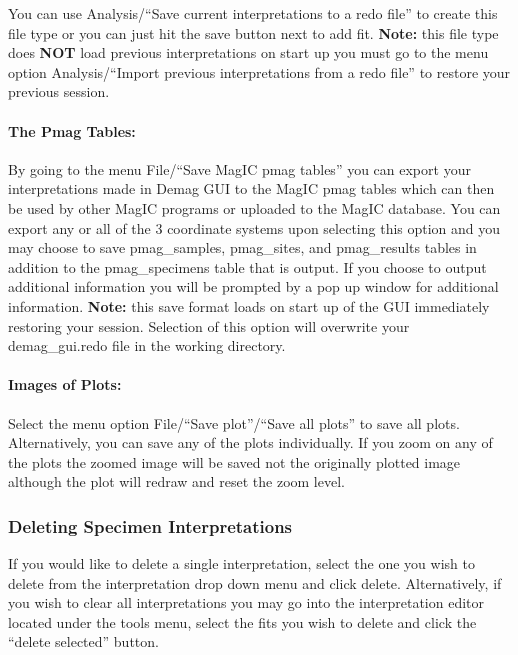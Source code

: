 You can use Analysis/``Save current interpretations to a redo file'' to
create this file type or you can just hit the save button next to add
fit. \textbf{Note:} this file type does \textbf{NOT} load previous
interpretations on start up you must go to the menu option
Analysis/``Import previous interpretations from a redo file'' to restore
your previous session.

\paragraph{The Pmag Tables:}\label{the-pmag-tables}

By going to the menu File/``Save MagIC pmag tables'' you can export your
interpretations made in Demag GUI to the MagIC pmag tables which can
then be used by other MagIC programs or uploaded to the MagIC database.
You can export any or all of the 3 coordinate systems upon selecting
this option and you may choose to save pmag\_samples, pmag\_sites, and
pmag\_results tables in addition to the pmag\_specimens table that is
output. If you choose to output additional information you will be
prompted by a pop up window for additional information. \textbf{Note:}
this save format loads on start up of the GUI immediately restoring your
session. Selection of this option will overwrite your demag\_gui.redo
file in the working directory.

\paragraph{Images of Plots:}\label{images-of-plots}

Select the menu option File/``Save plot''/``Save all plots'' to save all
plots. Alternatively, you can save any of the plots individually. If you
zoom on any of the plots the zoomed image will be saved not the
originally plotted image although the plot will redraw and reset the
zoom level.

\subsubsection{Deleting Specimen
Interpretations}\label{deleting-specimen-interpretations}

If you would like to delete a single interpretation, select the one you
wish to delete from the interpretation drop down menu and click delete.
Alternatively, if you wish to clear all interpretations you may go into
the interpretation editor located under the tools menu, select the fits
you wish to delete and click the ``delete selected'' button.\\

